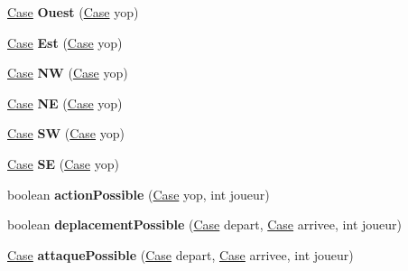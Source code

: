 \begin{DoxyCompactItemize}
\item 
\hyperlink{class_case}{Case} {\bfseries Ouest} (\hyperlink{class_case}{Case} yop)\hypertarget{class_damier_ab7ee970b51b4c0226ffd818ee7b25f4f}{}\label{class_damier_ab7ee970b51b4c0226ffd818ee7b25f4f}

\item 
\hyperlink{class_case}{Case} {\bfseries Est} (\hyperlink{class_case}{Case} yop)\hypertarget{class_damier_a3347285ddc8bd1def8d393ddcb3ef68d}{}\label{class_damier_a3347285ddc8bd1def8d393ddcb3ef68d}

\item 
\hyperlink{class_case}{Case} {\bfseries NW} (\hyperlink{class_case}{Case} yop)\hypertarget{class_damier_a44ecf6c5e0d0ac651e36568a83a8dd90}{}\label{class_damier_a44ecf6c5e0d0ac651e36568a83a8dd90}

\item 
\hyperlink{class_case}{Case} {\bfseries NE} (\hyperlink{class_case}{Case} yop)\hypertarget{class_damier_afba7ae9ce0ca580b6803ceae326f5e02}{}\label{class_damier_afba7ae9ce0ca580b6803ceae326f5e02}

\item 
\hyperlink{class_case}{Case} {\bfseries SW} (\hyperlink{class_case}{Case} yop)\hypertarget{class_damier_ad317036c71ddb0eaabcf8b754c70e37e}{}\label{class_damier_ad317036c71ddb0eaabcf8b754c70e37e}

\item 
\hyperlink{class_case}{Case} {\bfseries SE} (\hyperlink{class_case}{Case} yop)\hypertarget{class_damier_aa310ab704cc37cb5c1ef8953012ae9c8}{}\label{class_damier_aa310ab704cc37cb5c1ef8953012ae9c8}

\item 
boolean {\bfseries action\+Possible} (\hyperlink{class_case}{Case} yop, int joueur)\hypertarget{class_damier_ab15b6599529770e83b70936e89e69235}{}\label{class_damier_ab15b6599529770e83b70936e89e69235}

\item 
boolean {\bfseries deplacement\+Possible} (\hyperlink{class_case}{Case} depart, \hyperlink{class_case}{Case} arrivee, int joueur)\hypertarget{class_damier_ace56252a058aa7c8ca7ed5f36699d10d}{}\label{class_damier_ace56252a058aa7c8ca7ed5f36699d10d}

\item 
\hyperlink{class_case}{Case} {\bfseries attaque\+Possible} (\hyperlink{class_case}{Case} depart, \hyperlink{class_case}{Case} arrivee, int joueur)\hypertarget{class_damier_aa55a611ac55d1fd9af10d231aa63bfb4}{}\label{class_damier_aa55a611ac55d1fd9af10d231aa63bfb4}


\end{DoxyCompactItemize}
